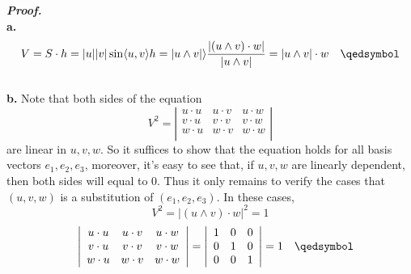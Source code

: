 \documentclass{article}
\begin{document}
\par
\textbf{\textit{Proof.}}\\
\textbf{a. }
$$
    V = S \cdot h = |u||v|\sin \langle u,v \rangle h = |u \wedge v| \rangle \frac{|(u \wedge v) \cdot w|}{|u \wedge v|} = |u \wedge v| \cdot w 
    \quad \qedsymbol
$$\\
\textbf{b. }Note that both sides of the equation
$$
    V^2 = 
    \left|\begin{array}{ccc} 
        u \cdot u & u \cdot v & u \cdot w \\ 
        v \cdot u & v \cdot v & v \cdot w \\ 
        w \cdot u & w \cdot v & w \cdot w \\ 
    \end{array}\right|
$$
are linear in $u,v,w$. So it suffices to show that the equation holds for all basis vectors $e_1, e_2, e_3$, moreover, it's easy to see that,
if $u, v, w$ are linearly dependent, then both sides will equal to 0. Thus it only remains to verify the cases that $(u, v, w)$ is a 
substitution of $(e_1, e_2, e_3)$. In these cases,
$$
    V^2 = |(u \wedge v) \cdot w|^2 = 1
$$
$$
    \quad
    \left|\begin{array}{ccc} 
    u \cdot u & u \cdot v & u \cdot w \\ 
    v \cdot u & v \cdot v & v \cdot w \\ 
    w \cdot u & w \cdot v & w \cdot w \\ 
    \end{array}\right|
    =
    \left|\begin{array}{ccc} 
    1 & 0 & 0 \\ 
    0 & 1 & 0 \\ 
    0 & 0 & 1 \\ 
    \end{array}\right|
    = 1 \quad \qedsymbol
$$
\end{document}
